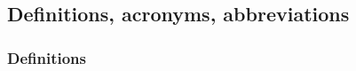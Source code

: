 \documentclass[12pt]{article}
\begin{document}
  \subsection{Definitions, acronyms, abbreviations}

    \subsubsection{Definitions}
    \label{sec:definitions}

      \begin{description}
        \item[]

\end{description}
\end{document}
